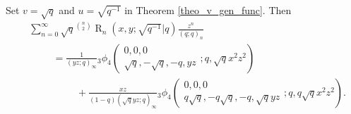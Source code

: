 \documentclass{cimart}
\DeclareMathOperator{\opR}{R}
\begin{document}
\begin{corollary}
Set $v=\sqrt{q}$ and $u=\sqrt{q^{-1}}$ in Theorem \ref{theo_v_gen_func}. Then
\begin{align}
    &\sum_{n=0}^{\infty}\sqrt{q}^{\binom{n}{2}}\opR_{n}(x,y;\sqrt{q^{-1}}|q)\frac{z^n}{(q;q)_{n}}\nonumber\\
    &\hspace{1cm}=\frac{1}{(yz;q)_{\infty}}{}_{3}\phi_{4}\left(
        \begin{array}{c}
            0,0,0\\
             \sqrt{q},-\sqrt{q},-q,yz
        \end{array};
        q,\sqrt{q}x^2z^2
        \right)\nonumber\\
        &\hspace{2cm}+\frac{xz}{(1-q)(\sqrt{q}yz;q)_{\infty}}{}_{3}\phi_{4}\left(
        \begin{array}{c}
            0,0,0\\
             q\sqrt{q},-q\sqrt{q},-q,\sqrt{q}yz
        \end{array};
        q,q\sqrt{q}x^2z^2
        \right).
\end{align}
\end{corollary}
\end{document}
